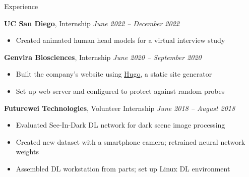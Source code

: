 	\begin{rSection}{Experience}

		{\bf UC San Diego}{, Internship} \hfill {\em June 2022 -- December 2022}
		\begin{itemize}
			\item Created animated human head models for a virtual interview study
		\end{itemize}

		{\bf Genvira Biosciences}{, Internship} \hfill {\em June 2020 -- September 2020}
		\begin{itemize}
			\item Built the company's website using \href{https://gohugo.io/}{Hugo}, a static site generator
			\item Set up web server and configured to protect against random probes
		\end{itemize}

		{\bf Futurewei Technologies}{, Volunteer Internship} \hfill {\em June 2018 -- August 2018}
		\begin{itemize}
			\item Evaluated See-In-Dark DL network for dark scene image processing
			\item Created new dataset with a smartphone camera; retrained neural network weights
			\item Assembled DL workstation from parts; set up Linux DL environment
		\end{itemize}
	\end{rSection}
	
